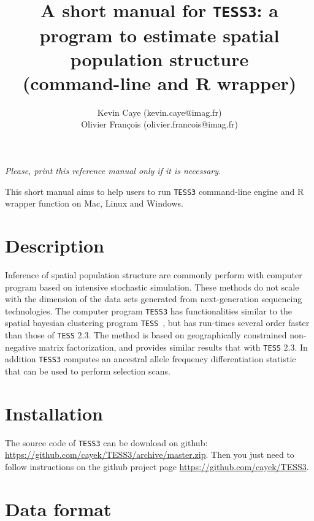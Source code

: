\documentclass[10pt,a4paper]{article}
\title{\bf \Large A short manual for {\tt TESS3}:
a program to estimate spatial population structure\\
\large (command-line and R wrapper)
}
\author{
        Kevin Caye (kevin.caye@imag.fr)\\
        Olivier François (olivier.francois@imag.fr)\\
}
\begin{document}
\maketitle
\begin{center}
{\it Please, print this reference manual only if it is necessary.}
\end{center}

\noindent
This short manual aims to help users to run {\tt TESS3} command-line engine and R wrapper function on Mac, Linux and Windows.

\section{Description} 

Inference of spatial population structure are commonly perform with computer program based on intensive stochastic simulation. These methods do not scale with the dimension of the data sets generated from next-generation sequencing technologies. The computer program {\tt TESS3} has functionalities similar to the spatial bayesian clustering program  {\tt TESS}~\cite{durand2009spatial}, but has run-times several order faster than those of {\tt TESS} 2.3. The method is based on geographically constrained non-negative matrix factorization, and provides similar results that with {\tt TESS} 2.3. In addition {\tt TESS3} computes an ancestral allele frequency differentiation statistic that can be used to perform selection scans.

\section{Installation} 

The source code of {\tt TESS3} can be download on github: 
 \url{https://github.com/cayek/TESS3/archive/master.zip}.
Then you just need to follow instructions on the github project page \url{https://github.com/cayek/TESS3}.

\section{Data format}
\end{document}
